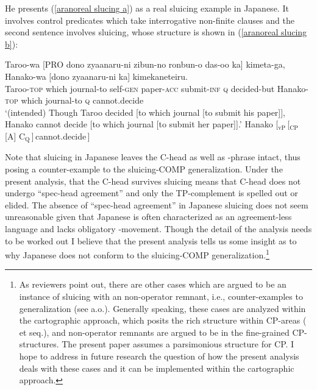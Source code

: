 \documentclass[output=paper]{langscibook}
\begin{document}
He presents (\ref{aranoreal slucing a}) as a real sluicing example in Japanese. It involves control predicates which take interrogative non-finite clauses and the second sentence involves sluicing, whose structure is shown in (\ref{aranoreal slucing b}):

\ea 
\ea \label{aranoreal slucing a}
\gll Taroo-wa \textup{[}PRO dono zyaanaru-ni zibun-no ronbun-o das-oo ka\textup{]} kimeta-ga, Hanako-wa \textup{[}dono zyaanaru-ni ka\textup{]} kimekaneteiru.    \\
Taroo-\textsc{top} {} which journal-to self-\textsc{gen} paper-\textsc{acc} submit-\textsc{inf} \textsc{q} decided-but Hanako-\textsc{top} \phantom{[}which journal-to \textsc{q} cannot.decide  \\
\glt `(intended) Though Taroo decided [to which journal [to submit his paper]], Hanako cannot decide [to which journal [to submit her paper]].'
\ex\label{aranoreal slucing b}Hanako [$_{\mathrm{vP}}$\,[$_{\mathrm{CP}}$ [A]  C$_{\mathrm{Q}}$\,]\,cannot.decide\,]
\z
\z 
{} 

\noindent Note that sluicing in Japanese leaves the C-head as well as \wh-phrase intact, thus posing a counter-example to the sluicing-COMP generalization. Under the present analysis, that the C-head survives sluicing means that C-head does not undergo ``spec-head agreement'' and only the TP-complement is spelled out or elided. The absence of ``spec-head agreement'' in Japanese sluicing does not seem unreasonable given that Japanese is often characterized as an agreement-less language and lacks obligatory \wh-movement. Though the detail of the analysis needs to be worked out I believe that the present analysis tells us some insight as to why Japanese does not conform to the sluicing-COMP generalization.\footnote{As reviewers point out, there are other cases which are argued to be an instance of sluicing with an non-operator remnant, i.e., counter-examples to  generalization (see \citet{Craenenbroeck2010The-syntax-of-e, Craenenbroeck2013What-sluicing-c, Marusic2015On-a-potential-, Marusic2018Surviving-sluic} a.o.). Generally speaking, these cases are analyzed within the cartographic approach, which posits the rich structure within CP-areas (\citet{Rizzi1997The-fine-struct} et seq.), and non-operator remnants are argued to be in the fine-grained CP-structures. The present paper assumes a parsimonious structure for CP\@. I hope to address in future research the question of how the present analysis deals with these cases and it can be implemented within the cartographic approach.}
\end{document}
